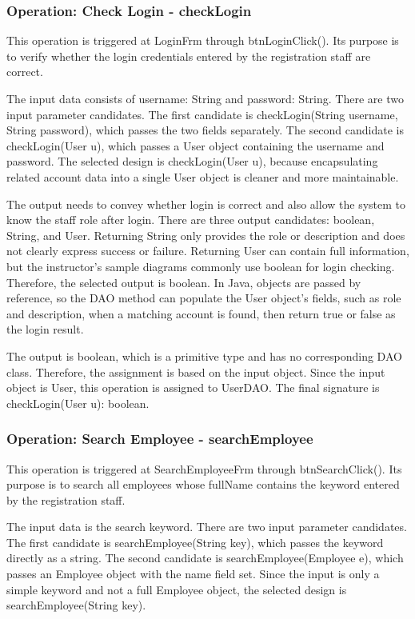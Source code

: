 \subsubsection{Operation: Check Login - checkLogin}

This operation is triggered at LoginFrm through btnLoginClick(). Its purpose is to verify whether the login credentials entered by the registration staff are correct.

The input data consists of username: String and password: String. There are two input parameter candidates. The first candidate is checkLogin(String username, String password), which passes the two fields separately. The second candidate is checkLogin(User u), which passes a User object containing the username and password. The selected design is checkLogin(User u), because encapsulating related account data into a single User object is cleaner and more maintainable.

The output needs to convey whether login is correct and also allow the system to know the staff role after login. There are three output candidates: boolean, String, and User. Returning String only provides the role or description and does not clearly express success or failure. Returning User can contain full information, but the instructor's sample diagrams commonly use boolean for login checking. Therefore, the selected output is boolean. In Java, objects are passed by reference, so the DAO method can populate the User object's fields, such as role and description, when a matching account is found, then return true or false as the login result.

The output is boolean, which is a primitive type and has no corresponding DAO class. Therefore, the assignment is based on the input object. Since the input object is User, this operation is assigned to UserDAO. The final signature is checkLogin(User u): boolean.

\subsubsection{Operation: Search Employee - searchEmployee}

This operation is triggered at SearchEmployeeFrm through btnSearchClick(). Its purpose is to search all employees whose fullName contains the keyword entered by the registration staff.

The input data is the search keyword. There are two input parameter candidates. The first candidate is searchEmployee(String key), which passes the keyword directly as a string. The second candidate is searchEmployee(Employee e), which passes an Employee object with the name field set. Since the input is only a simple keyword and not a full Employee object, the selected design is searchEmployee(String key).

